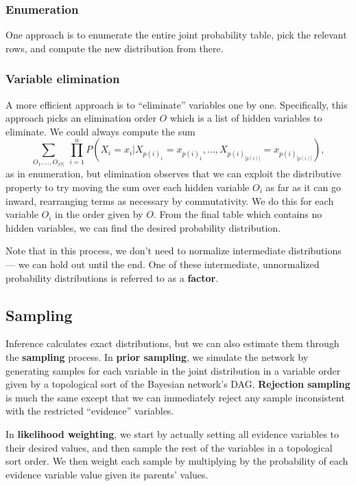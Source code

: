 \documentclass[12pt]{article}
\begin{document}
\subsubsection{Enumeration}

One approach is to enumerate the entire joint probability table, pick the relevant rows, and compute the new distribution from there.

\subsubsection{Variable elimination}

A more efficient approach is to ``eliminate'' variables one by one. Specifically, this approach picks an elimination order $O$ which is a list of hidden variables to eliminate. We could always compute the sum
\[ \sum_{O_1, \ldots, O_{|O|}}\ \prod_{i = 1}^n P(X_i = x_i | X_{p(i)_1} = x_{p(i)_1}, \ldots, X_{p(i)_{|p(i)|}} = x_{p(i)_{|p(i)|}}), \]
as in enumeration, but elimination observes that we can exploit the distributive property to try moving the sum over each hidden variable $O_i$ as far as it can go inward, rearranging terms as necessary by commutativity. We do this for each variable $O_i$ in the order given by $O$. From the final table which contains no hidden variables, we can find the desired probability distribution.

Note that in this process, we don't need to normalize intermediate distributions --- we can hold out until the end. One of these intermediate, unnormalized probability distributions is referred to as a \textbf{factor}.

\subsection{Sampling}

Inference calculates exact distributions, but we can also estimate them through the \textbf{sampling} process. In \textbf{prior sampling}, we simulate the network by generating samples for each variable in the joint distribution in a variable order given by a topological sort of the Bayesian network's DAG. \textbf{Rejection sampling} is much the same except that we can immediately reject any sample inconsistent with the restricted ``evidence'' variables.

In \textbf{likelihood weighting}, we start by actually setting all evidence variables to their desired values, and then sample the rest of the variables in a topological sort order. We then weight each sample by multiplying by the probability of each evidence variable value given its parents' values.
\end{document}
